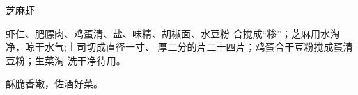 \begin{recipe}{芝麻虾}

\ingredients



\cooking

\step 	虾仁、肥膘肉、鸡蛋清、盐、味精、胡椒面、水豆粉 合搅成“糁”；芝麻用水淘净，晾干水气;土司切成直径一寸、 厚二分的片二十四片；鸡蛋合干豆粉搅成蛋清豆粉；生菜淘 洗干净待用。

\notes

酥脆香嫩，佐酒好菜。

\end{recipe}

